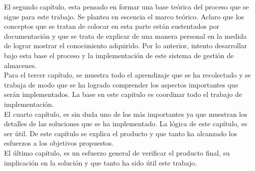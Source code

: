 El segundo capítulo, esta pensado en formar una base teórica del proceso que se sigue para este trabajo. Se plantea en escencia el marco teórico. Aclaro que los conceptos que se tratan de colocar en esta parte están sustentados por documentación y que se trata de explicar de una manera personal en la medida de lograr mostrar el conocimiento adquirido. Por lo anterior, intento desarrollar bajo esta base el proceso y la implementación de este sistema de gestión de almacenes.\\

Para el tercer capítulo, se muestra todo el aprendizaje que se ha recolectado y se trabaja de modo que se ha logrado comprender los aspectos importantes que serán implementados. La base en este capitulo es coordinar todo el trabajo de implementación.\\

El cuarto capítulo, es sin duda uno de los más importantes ya que muestran los detalles de las soluciones que se ha implementado. La lógica de este capítulo, es ser útil. De este capítulo se explica el producto y que tanto ha alcanzado los esfuerzos a los objetivos propuestos.\\

El último capítulo, es un esfuerzo general de verificar el producto final, su implicación en la solución y que tanto ha sido útil este trabajo.\\
